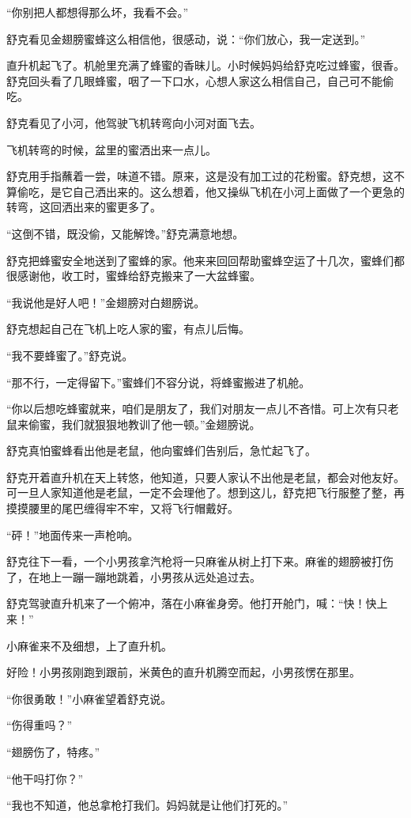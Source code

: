 \documentclass[a4paper,12pt,UTF8,twoside]{ctexbook}
\begin{document}
“你别把人都想得那么坏，我看不会。”

舒克看见金翅膀蜜蜂这么相信他，很感动，说：“你们放心，我一定送到。”

直升机起飞了。机舱里充满了蜂蜜的香昧儿。小时候妈妈给舒克吃过蜂蜜，很香。舒克回头看了几眼蜂蜜，咽了一下口水，心想人家这么相信自己，自己可不能偷吃。

舒克看见了小河，他驾驶飞机转弯向小河对面飞去。

飞机转弯的时候，盆里的蜜洒出来一点儿。

舒克用手指蘸着一尝，味道不错。原来，这是没有加工过的花粉蜜。舒克想，这不算偷吃，是它自己洒出来的。这么想着，他又操纵飞机在小河上面做了一个更急的转弯，这回洒出来的蜜更多了。

“这倒不错，既没偷，又能解馋。”舒克满意地想。

舒克把蜂蜜安全地送到了蜜蜂的家。他来来回回帮助蜜蜂空运了十几次，蜜蜂们都很感谢他，收工时，蜜蜂给舒克搬来了一大盆蜂蜜。

“我说他是好人吧！”金翅膀对白翅膀说。

舒克想起自己在飞机上吃人家的蜜，有点儿后悔。

“我不要蜂蜜了。”舒克说。

“那不行，一定得留下。”蜜蜂们不容分说，将蜂蜜搬进了机舱。

“你以后想吃蜂蜜就来，咱们是朋友了，我们对朋友一点儿不吝惜。可上次有只老鼠来偷蜜，我们就狠狠地教训了他一顿。”金翅膀说。

舒克真怕蜜蜂看出他是老鼠，他向蜜蜂们告别后，急忙起飞了。

舒克开着直升机在天上转悠，他知道，只要人家认不出他是老鼠，都会对他友好。可一旦人家知道他是老鼠，一定不会理他了。想到这儿，舒克把飞行服整了整，再摸摸腰里的尾巴缠得牢不牢，又将飞行帽戴好。

“砰！”地面传来一声枪响。

舒克往下一看，一个小男孩拿汽枪将一只麻雀从树上打下来。麻雀的翅膀被打伤了，在地上一蹦一蹦地跳着，小男孩从远处追过去。

舒克驾驶直升机来了一个俯冲，落在小麻雀身旁。他打开舱门，喊：“快！快上来！”

小麻雀来不及细想，上了直升机。

好险！小男孩刚跑到跟前，米黄色的直升机腾空而起，小男孩愣在那里。

“你很勇敢！”小麻雀望着舒克说。

“伤得重吗？”

“翅膀伤了，特疼。”

“他干吗打你？”

“我也不知道，他总拿枪打我们。妈妈就是让他们打死的。”
\end{document}
